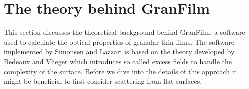\section{\textbf{The theory behind GranFilm}}
This section discusses the theoretical background behind GranFilm, a software used to calculate
the optical properties of granular thin films. The software implemented by Simonsen and Lazzari
is based on the theory developed by Bedeaux and Vlieger \cite{BedeauxVliegerBook} which introduces
so called excess fields to handle the complexity of the surface. Before we dive into the details
of this approach it might be beneficial to first consider scattering from flat surfaces.

